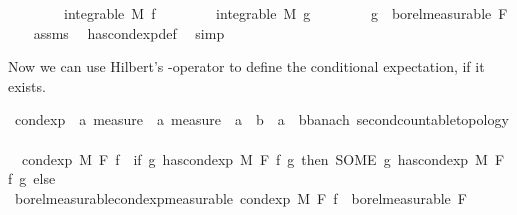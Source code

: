 \begin{isabellebody}
\ \ \ \ \ \ \ \ {\isachardoublequoteopen}integrable\ M\ f{\isachardoublequoteclose}\isanewline
\ \ \ \ \ \ \ \ {\isachardoublequoteopen}integrable\ M\ g{\isachardoublequoteclose}\isanewline
\ \ \ \ \ \ \ \ {\isachardoublequoteopen}g\ {\isasymin}\ borel{\isacharunderscore}{\kern0pt}measurable\ F{\isachardoublequoteclose}\isanewline
%
\isadelimproof
\ \ %
\endisadelimproof
%
\isatagproof
{}\isamarkupfalse%
\ assms\ \isamarkupfalse%
\ has{\isacharunderscore}{\kern0pt}cond{\isacharunderscore}{\kern0pt}exp{\isacharunderscore}{\kern0pt}def\ \isamarkupfalse%
\ simp{\isacharplus}{\kern0pt}%
\endisatagproof
{\isafoldproof}%
%
\isadelimproof
%
\endisadelimproof
%
\begin{isamarkuptext}%
Now we can use Hilbert’s \isa{{\isasymsome}}-operator to define the conditional expectation, if it exists.%
\end{isamarkuptext}\isamarkuptrue%
\isamarkupfalse%
\ cond{\isacharunderscore}{\kern0pt}exp\ {\isacharcolon}{\kern0pt}{\isacharcolon}{\kern0pt}\ {\isachardoublequoteopen}{\isacharprime}{\kern0pt}a\ measure\ {\isasymRightarrow}\ {\isacharprime}{\kern0pt}a\ measure\ {\isasymRightarrow}\ {\isacharparenleft}{\kern0pt}{\isacharprime}{\kern0pt}a\ {\isasymRightarrow}\ {\isacharprime}{\kern0pt}b{\isacharparenright}{\kern0pt}\ {\isasymRightarrow}\ {\isacharparenleft}{\kern0pt}{\isacharprime}{\kern0pt}a\ {\isasymRightarrow}\ {\isacharprime}{\kern0pt}b{\isacharcolon}{\kern0pt}{\isacharcolon}{\kern0pt}{\isacharbraceleft}{\kern0pt}banach{\isacharcomma}{\kern0pt}\ second{\isacharunderscore}{\kern0pt}countable{\isacharunderscore}{\kern0pt}topology{\isacharbraceright}{\kern0pt}{\isacharparenright}{\kern0pt}{\isachardoublequoteclose}\ \isanewline
\ \ {\isachardoublequoteopen}cond{\isacharunderscore}{\kern0pt}exp\ M\ F\ f\ {\isacharequal}{\kern0pt}\ {\isacharparenleft}{\kern0pt}if\ {\isasymexists}g{\isachardot}{\kern0pt}\ has{\isacharunderscore}{\kern0pt}cond{\isacharunderscore}{\kern0pt}exp\ M\ F\ f\ g\ then\ {\isacharparenleft}{\kern0pt}SOME\ g{\isachardot}{\kern0pt}\ has{\isacharunderscore}{\kern0pt}cond{\isacharunderscore}{\kern0pt}exp\ M\ F\ f\ g{\isacharparenright}{\kern0pt}\ else\ {\isacharparenleft}{\kern0pt}{\isasymlambda}{\isacharunderscore}{\kern0pt}{\isachardot}{\kern0pt}\ {}{\isacharparenright}{\kern0pt}{\isacharparenright}{\kern0pt}{\isachardoublequoteclose}\isanewline
\isanewline
{}\isamarkupfalse%
\ borel{\isacharunderscore}{\kern0pt}measurable{\isacharunderscore}{\kern0pt}cond{\isacharunderscore}{\kern0pt}exp{\isacharbrackleft}{\kern0pt}measurable{\isacharbrackright}{\kern0pt}{\isacharcolon}{\kern0pt}\ {\isachardoublequoteopen}cond{\isacharunderscore}{\kern0pt}exp\ M\ F\ f\ {\isasymin}\ borel{\isacharunderscore}{\kern0pt}measurable\ F{\isachardoublequoteclose}\ \isanewline

\end{isabellebody}
